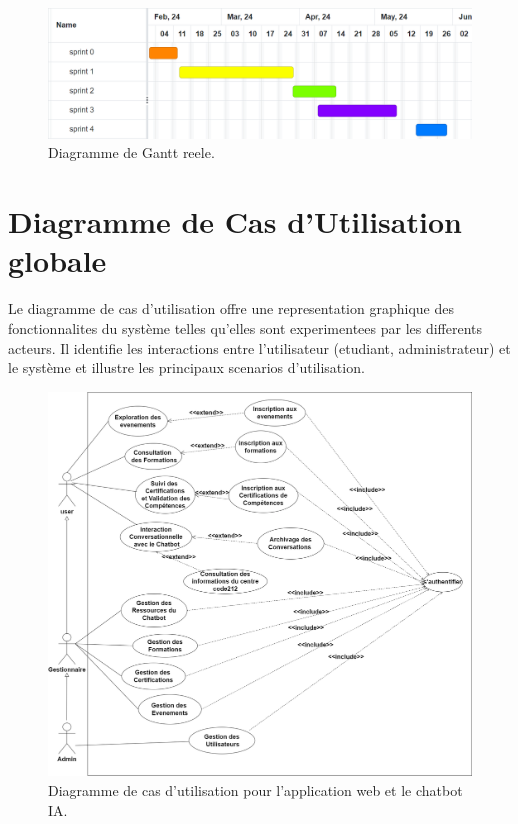 \documentclass[a4paper, 11pt, openany]{report}
\begin{document}
\begin{figure}[h!]
\centering
\includegraphics[width=\textwidth]{assets/images/gantt-reel.png}
\caption{Diagramme de Gantt reele.}
\label{fig:reel-gantt}
\end{figure}
\clearpage
\section{Diagramme de Cas d'Utilisation globale}
Le diagramme de cas d'utilisation offre une representation graphique des fonctionnalites du système telles qu'elles sont experimentees par les differents acteurs. Il identifie les interactions entre l'utilisateur (etudiant, administrateur) et le système et illustre les principaux scenarios d'utilisation. 
\clearpage

\begin{figure}[h!]

\centering
\includegraphics[width=\textwidth]{assets/images/usecase.png}
\caption{Diagramme de cas d'utilisation pour l'application web et le chatbot IA.}
\label{fig:use_case_diagram}
\end{figure}
\end{document}

